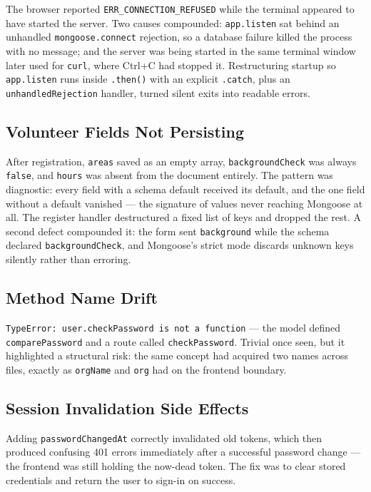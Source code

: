 \documentclass[11pt,letterpaper]{article}
\begin{document}
The browser reported \texttt{ERR\_CONNECTION\_REFUSED} while the terminal
appeared to have started the server. Two causes compounded:
\texttt{app.listen} sat behind an unhandled \texttt{mongoose.connect}
rejection, so a database failure killed the process with no message; and the
server was being started in the same terminal window later used for
\texttt{curl}, where Ctrl+C had stopped it. Restructuring startup so
\texttt{app.listen} runs inside \texttt{.then()} with an explicit
\texttt{.catch}, plus an \texttt{unhandledRejection} handler, turned silent
exits into readable errors.

\subsection{Volunteer Fields Not Persisting}

After registration, \texttt{areas} saved as an empty array,
\texttt{backgroundCheck} was always \texttt{false}, and \texttt{hours} was
absent from the document entirely. The pattern was diagnostic: every field
with a schema default received its default, and the one field without a
default vanished --- the signature of values never reaching Mongoose at all.
The register handler destructured a fixed list of keys and dropped the rest. A
second defect compounded it: the form sent \texttt{background} while the schema
declared \texttt{backgroundCheck}, and Mongoose's strict mode discards unknown
keys silently rather than erroring.

\subsection{Method Name Drift}

\texttt{TypeError: user.checkPassword is not a function} --- the model defined
\texttt{comparePassword} and a route called \texttt{checkPassword}. Trivial
once seen, but it highlighted a structural risk: the same concept had acquired
two names across files, exactly as \texttt{orgName} and \texttt{org} had on the
frontend boundary.

\subsection{Session Invalidation Side Effects}

Adding \texttt{passwordChangedAt} correctly invalidated old tokens, which then
produced confusing 401 errors immediately after a successful password change
--- the frontend was still holding the now-dead token. The fix was to clear
stored credentials and return the user to sign-in on success.
\end{document}
